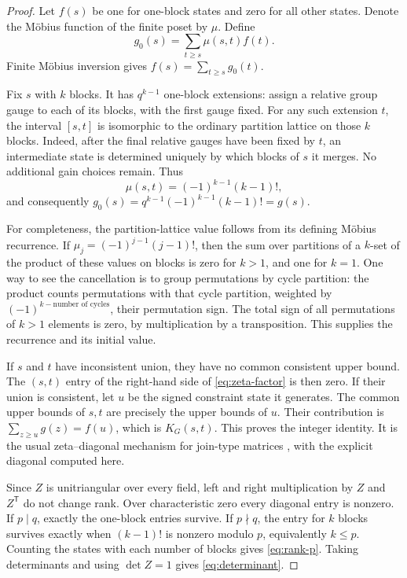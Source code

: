 \documentclass[11pt,letterpaper]{article}
\theoremstyle{definition}
\begin{document}
\begin{proof}
Let $f(s)$ be one for one-block states and zero for all other states. Denote the M\"obius function of the finite poset by $\mu$. Define
\[
 g_0(s)=\sum_{t\ge s}\mu(s,t)f(t).
\]
Finite M\"obius inversion gives $f(s)=\sum_{t\ge s}g_0(t)$.

Fix $s$ with $k$ blocks. It has $q^{k-1}$ one-block extensions: assign a relative group gauge to each of its blocks, with the first gauge fixed. For any such extension $t$, the interval $[s,t]$ is isomorphic to the ordinary partition lattice on those $k$ blocks. Indeed, after the final relative gauges have been fixed by $t$, an intermediate state is determined uniquely by which blocks of $s$ it merges. No additional gain choices remain. Thus
\[
 \mu(s,t)=(-1)^{k-1}(k-1)!,
\]
and consequently $g_0(s)=q^{k-1}(-1)^{k-1}(k-1)!=g(s)$.

For completeness, the partition-lattice value follows from its defining M\"obius recurrence. If $\mu_j=(-1)^{j-1}(j-1)!$, then the sum over partitions of a $k$-set of the product of these values on blocks is zero for $k>1$, and one for $k=1$. One way to see the cancellation is to group permutations by cycle partition: the product counts permutations with that cycle partition, weighted by $(-1)^{k-\text{number of cycles}}$, their permutation sign. The total sign of all permutations of $k>1$ elements is zero, by multiplication by a transposition. This supplies the recurrence and its initial value.

If $s$ and $t$ have inconsistent union, they have no common consistent upper bound. The $(s,t)$ entry of the right-hand side of \eqref{eq:zeta-factor} is then zero. If their union is consistent, let $u$ be the signed constraint state it generates. The common upper bounds of $s,t$ are precisely the upper bounds of $u$. Their contribution is $\sum_{z\ge u}g(z)=f(u)$, which is $K_G(s,t)$. This proves the integer identity. It is the usual zeta--diagonal mechanism for join-type matrices \cite{lindstrom}, with the explicit diagonal computed here.

Since $Z$ is unitriangular over every field, left and right multiplication by $Z$ and $Z^{\mathsf T}$ do not change rank. Over characteristic zero every diagonal entry is nonzero. If $p\mid q$, exactly the one-block entries survive. If $p\nmid q$, the entry for $k$ blocks survives exactly when $(k-1)!$ is nonzero modulo $p$, equivalently $k\le p$. Counting the states with each number of blocks gives \eqref{eq:rank-p}. Taking determinants and using $\det Z=1$ gives \eqref{eq:determinant}.
\end{proof}
\end{document}
